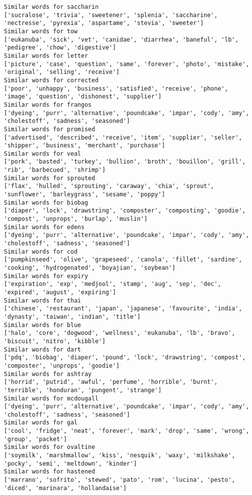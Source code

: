 \documentclass[11pt]{article}
\begin{document}
\begin{Verbatim}[commandchars=\\\{\}]
Similar words for saccharin
['sucralose', 'trivia', 'sweetener', 'splenia', 'saccharine', 'nectresse', 'pyrexia', 'aspartame', 'stevia', 'sweeter']
Similar words for tow
['eukanuba', 'sick', 'vet', 'canidae', 'diarrhea', 'baneful', 'lb', 'pedigree', 'chow', 'digestive']
Similar words for letter
['picture', 'case', 'question', 'same', 'forever', 'photo', 'mistake', 'original', 'selling', 'receive']
Similar words for corrected
['poor', 'unhappy', 'business', 'satisfied', 'receive', 'phone', 'image', 'question', 'dishonest', 'supplier']
Similar words for frangos
['dyeing', 'purr', 'alternative', 'poundcake', 'impar', 'cody', 'amy', 'cholestoff', 'sadness', 'seasoned']
Similar words for promised
['advertised', 'described', 'receive', 'item', 'supplier', 'seller', 'shipper', 'business', 'merchant', 'purchase']
Similar words for veal
['pork', 'basted', 'turkey', 'bullion', 'broth', 'bouillon', 'grill', 'rib', 'barbecued', 'shrimp']
Similar words for sprouted
['flax', 'hulled', 'sprouting', 'caraway', 'chia', 'sprout', 'sunflower', 'barleygrass', 'sesame', 'poppy']
Similar words for biobag
['diaper', 'lock', 'drawstring', 'composter', 'composting', 'goodie', 'compost', 'unprops', 'burlap', 'muslin']
Similar words for edens
['dyeing', 'purr', 'alternative', 'poundcake', 'impar', 'cody', 'amy', 'cholestoff', 'sadness', 'seasoned']
Similar words for cod
['pumpkinseed', 'olive', 'grapeseed', 'canola', 'fillet', 'sardine', 'cooking', 'hydrogenated', 'boyajian', 'soybean']
Similar words for expiry
['expiration', 'exp', 'medjool', 'stamp', 'aug', 'sep', 'dec', 'expired', 'august', 'expiring']
Similar words for thai
['chinese', 'restaurant', 'japan', 'japanese', 'favourite', 'india', 'dynasty', 'taiwan', 'indian', 'title']
Similar words for blue
['halo', 'core', 'dogwood', 'wellness', 'eukanuba', 'lb', 'bravo', 'biscuit', 'nitro', 'kibble']
Similar words for dart
['pdq', 'biobag', 'diaper', 'pound', 'lock', 'drawstring', 'compost', 'composter', 'unprops', 'goodie']
Similar words for ashtray
['horrid', 'putrid', 'awful', 'perfume', 'horrible', 'burnt', 'terrible', 'honduran', 'pungent', 'strange']
Similar words for mcdougall
['dyeing', 'purr', 'alternative', 'poundcake', 'impar', 'cody', 'amy', 'cholestoff', 'sadness', 'seasoned']
Similar words for gal
['cool', 'fridge', 'neat', 'forever', 'mark', 'drop', 'same', 'wrong', 'group', 'packet']
Similar words for ovaltine
['soymilk', 'marshmallow', 'kiss', 'nesquik', 'waxy', 'milkshake', 'pocky', 'semi', 'meltdown', 'kinder']
Similar words for hastened
['marrano', 'sofrito', 'stewed', 'pato', 'rom', 'lucina', 'pesto', 'diced', 'marinara', 'hollandaise']

\end{Verbatim}
\end{document}
